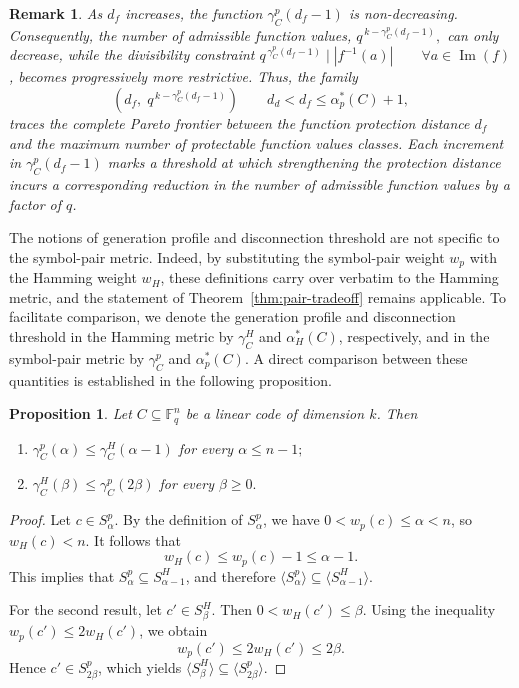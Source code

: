 \documentclass[11pt,draftclsnofoot,journal,onecolumn]{IEEEtran}
\newtheorem{proposition}{Proposition}
\newtheorem{remark}{Remark}
\begin{document}
    \begin{remark} 
        As $d_f$ increases, the function $\gamma_C^p(d_f-1)$ is non-decreasing. Consequently, the number of admissible function values, $q^{\,k-\gamma_C^p(d_f-1)},$ can only decrease, while the divisibility constraint $q^{\,\gamma_C^p(d_f-1)} \mid |f^{-1}(a)| \qquad \forall a \in \operatorname{Im}(f)$, becomes progressively more restrictive. Thus, the family
        \[
            \left(d_f,\; q^{\,k-\gamma_C^p(d_f-1)}\right) \qquad d_d < d_f \le \alpha_p^*(C) + 1,
        \]
        traces the complete Pareto frontier between the function protection distance $d_f$ and the maximum number of protectable function values classes. Each increment in $\gamma_C^p(d_f-1)$ marks a threshold at which strengthening the protection distance incurs a corresponding reduction in the number of admissible function values by a factor of $q$.
    \end{remark}

    
        The notions of generation profile and disconnection threshold are not specific to the symbol-pair metric. Indeed, by substituting the symbol-pair weight $w_p$ with the Hamming weight $w_H$, these definitions carry over verbatim to the Hamming metric, and the statement of Theorem~\ref{thm:pair-tradeoff} remains applicable. To facilitate comparison, we denote the generation profile and disconnection threshold in the Hamming metric by $\gamma_C^H$ and $\alpha_H^*(C)$, respectively, and in the symbol-pair metric by $\gamma_C^p$ and $\alpha_p^*(C)$. A direct comparison between these quantities is established in the following proposition.
    

    \begin{proposition}
    \label{prop:gamma-ham-pair}
        Let $C \subseteq \mathbb{F}_q^n$ be a linear code of dimension $k$. Then
        \begin{enumerate}
            \item[(i)] $\gamma_C^p(\alpha) \leq \gamma_C^H(\alpha-1)$ for every $\alpha \leq n-1;$
            \item[(ii)] $\gamma_C^H(\beta) \leq \gamma_C^p(2\beta)$ for every $\beta \geq 0.$
        \end{enumerate}
    \end{proposition}

    \begin{proof}
        Let $c \in S_\alpha^p$. By the definition of $S_\alpha^p$, we have $0 < w_p(c) \leq \alpha < n$, so $w_H(c) < n$. It follows that
        \[
        w_H(c) \leq w_p(c) - 1 \leq \alpha - 1.
        \]
        This implies that $S_\alpha^p \subseteq S_{\alpha-1}^H$, and therefore $\langle S_\alpha^p \rangle \subseteq \langle S_{\alpha-1}^H \rangle$.
        
        For the second result, let $c' \in S_\beta^H$. Then $0 <  w_H(c') \leq \beta$. Using the inequality $w_p(c') \leq 2w_H(c')$, we obtain
        \[
        w_p(c') \leq 2w_H(c') \leq 2\beta.
        \]
        Hence $c' \in S_{2\beta}^p$, which yields $\langle S_\beta^H \rangle \subseteq \langle S_{2\beta}^p \rangle$.
    \end{proof}
\end{document}
